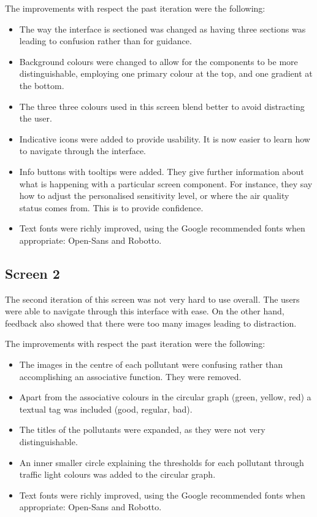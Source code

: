 The improvements with respect the past iteration were the following:
\begin{itemize}
    \item  The way the interface is sectioned was changed as having three sections was leading to confusion rather than for guidance.
    \item Background colours were changed to allow for the components to be more distinguishable, employing one primary colour at the top, and one gradient at the bottom.
    \item  The three three colours used in this screen blend better to avoid distracting the user.
    \item Indicative icons were added to provide usability. It is now easier to learn how to navigate through the interface.
    \item Info buttons with tooltips were added. They give further information about what is happening with a particular screen component. For instance, they say how to adjust the personalised sensitivity level, or where the air quality status comes from. This is to provide confidence. 
    \item Text fonts were richly improved, using the Google recommended fonts when appropriate:  Open-Sans and Robotto.
\end{itemize}

\subsection{Screen 2}
The second iteration of this screen was not very hard to use overall. The users were able to navigate through this interface with ease. On the other hand, feedback also showed that there were too many images leading to distraction. 

The improvements with respect the past iteration were the following:
\begin{itemize}
    \item The images in the centre of each pollutant were confusing rather than accomplishing an associative function. They were removed.
    \item Apart from the associative colours in the circular graph (green, yellow, red) a textual tag was included (good, regular, bad).
    \item The titles of the pollutants were expanded, as they were not very distinguishable. 
    \item An inner smaller circle explaining the thresholds for each pollutant through traffic light colours was added to the circular graph. 
    \item Text fonts were richly improved, using the Google recommended fonts when appropriate:  Open-Sans and Robotto.	
\end{itemize}

